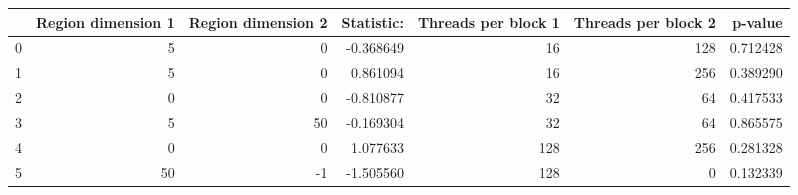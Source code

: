 \begin{tabular}{lrrrrrr}
\toprule
{} &  Region dimension 1 &  Region dimension 2 &  Statistic: &  Threads per block 1 &  Threads per block 2 &   p-value \\
\midrule
0 &                   5 &                   0 &   -0.368649 &                   16 &                  128 &  0.712428 \\
1 &                   5 &                   0 &    0.861094 &                   16 &                  256 &  0.389290 \\
2 &                   0 &                   0 &   -0.810877 &                   32 &                   64 &  0.417533 \\
3 &                   5 &                  50 &   -0.169304 &                   32 &                   64 &  0.865575 \\
4 &                   0 &                   0 &    1.077633 &                  128 &                  256 &  0.281328 \\
5 &                  50 &                  -1 &   -1.505560 &                  128 &                    0 &  0.132339 \\
\bottomrule
\end{tabular}
